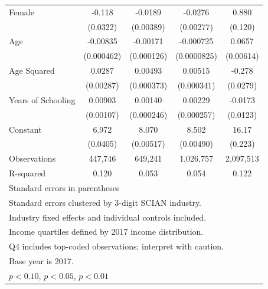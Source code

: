 \begin{table}[htbp]
\begin{tabular}{l*{4}{c}}
\addlinespace
Female              &      -0.118\sym{***}&     -0.0189\sym{***}&     -0.0276\sym{***}&       0.880\sym{***}\\
                    &    (0.0322)         &   (0.00389)         &   (0.00277)         &     (0.120)         \\
\addlinespace
Age                 &    -0.00835\sym{***}&    -0.00171\sym{***}&   -0.000725\sym{***}&      0.0657\sym{***}\\
                    &  (0.000462)         &  (0.000126)         & (0.0000825)         &   (0.00614)         \\
\addlinespace
Age Squared         &      0.0287\sym{***}&     0.00493\sym{***}&     0.00515\sym{***}&      -0.278\sym{***}\\
                    &   (0.00287)         &  (0.000373)         &  (0.000341)         &    (0.0279)         \\
\addlinespace
Years of Schooling  &     0.00903\sym{***}&     0.00140\sym{***}&     0.00229\sym{***}&     -0.0173         \\
                    &   (0.00107)         &  (0.000246)         &  (0.000257)         &    (0.0123)         \\
\addlinespace
Constant            &       6.972\sym{***}&       8.070\sym{***}&       8.502\sym{***}&       16.17\sym{***}\\
                    &    (0.0405)         &   (0.00517)         &   (0.00490)         &     (0.223)         \\
\midrule
Observations        &     447,746         &     649,241         &   1,026,757         &   2,097,513         \\
R-squared           &       0.120         &       0.053         &       0.054         &       0.122         \\
\bottomrule
\multicolumn{5}{l}{\footnotesize Standard errors in parentheses}\\
\multicolumn{5}{l}{\footnotesize Standard errors clustered by 3-digit SCIAN industry.}\\
\multicolumn{5}{l}{\footnotesize Industry fixed effects and individual controls included.}\\
\multicolumn{5}{l}{\footnotesize Income quartiles defined by 2017 income distribution.}\\
\multicolumn{5}{l}{\footnotesize Q4 includes top-coded observations; interpret with caution.}\\
\multicolumn{5}{l}{\footnotesize Base year is 2017.}\\
\multicolumn{5}{l}{\footnotesize \sym{*} \(p<0.10\), \sym{**} \(p<0.05\), \sym{***} \(p<0.01\)}\\
\end{tabular}
\end{table}
